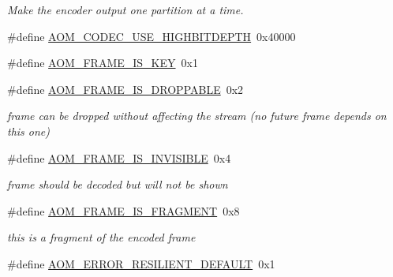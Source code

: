 \begin{DoxyCompactItemize}
\begin{DoxyCompactList}\small\item\em Make the encoder output one partition at a time. \end{DoxyCompactList}\item 
\#define \hyperlink{group__encoder_gae30bbbdef18e9da3631b69c170533e92}{A\+O\+M\+\_\+\+C\+O\+D\+E\+C\+\_\+\+U\+S\+E\+\_\+\+H\+I\+G\+H\+B\+I\+T\+D\+E\+P\+TH}~0x40000
\item 
\#define \hyperlink{group__encoder_gaf4a58f123913a5eef0a3796f0619e5f3}{A\+O\+M\+\_\+\+F\+R\+A\+M\+E\+\_\+\+I\+S\+\_\+\+K\+EY}~0x1
\item 
\#define \hyperlink{group__encoder_ga5c5a0513ebc6177ce500370cf89ad489}{A\+O\+M\+\_\+\+F\+R\+A\+M\+E\+\_\+\+I\+S\+\_\+\+D\+R\+O\+P\+P\+A\+B\+LE}~0x2\hypertarget{group__encoder_ga5c5a0513ebc6177ce500370cf89ad489}{}\label{group__encoder_ga5c5a0513ebc6177ce500370cf89ad489}

\begin{DoxyCompactList}\small\item\em frame can be dropped without affecting the stream (no future frame depends on this one) \end{DoxyCompactList}\item 
\#define \hyperlink{group__encoder_ga6ab96593d60cbcaaa1b718ad65e6d3ce}{A\+O\+M\+\_\+\+F\+R\+A\+M\+E\+\_\+\+I\+S\+\_\+\+I\+N\+V\+I\+S\+I\+B\+LE}~0x4\hypertarget{group__encoder_ga6ab96593d60cbcaaa1b718ad65e6d3ce}{}\label{group__encoder_ga6ab96593d60cbcaaa1b718ad65e6d3ce}

\begin{DoxyCompactList}\small\item\em frame should be decoded but will not be shown \end{DoxyCompactList}\item 
\#define \hyperlink{group__encoder_gac7ed4e63a83eb9a31886dc7d584d1fc0}{A\+O\+M\+\_\+\+F\+R\+A\+M\+E\+\_\+\+I\+S\+\_\+\+F\+R\+A\+G\+M\+E\+NT}~0x8\hypertarget{group__encoder_gac7ed4e63a83eb9a31886dc7d584d1fc0}{}\label{group__encoder_gac7ed4e63a83eb9a31886dc7d584d1fc0}

\begin{DoxyCompactList}\small\item\em this is a fragment of the encoded frame \end{DoxyCompactList}\item 
\#define \hyperlink{group__encoder_ga4118658e1fc1590f72fec38478ae230d}{A\+O\+M\+\_\+\+E\+R\+R\+O\+R\+\_\+\+R\+E\+S\+I\+L\+I\+E\+N\+T\+\_\+\+D\+E\+F\+A\+U\+LT}~0x1\hypertarget{group__encoder_ga4118658e1fc1590f72fec38478ae230d}{}\label{group__encoder_ga4118658e1fc1590f72fec38478ae230d}


\end{DoxyCompactItemize}
